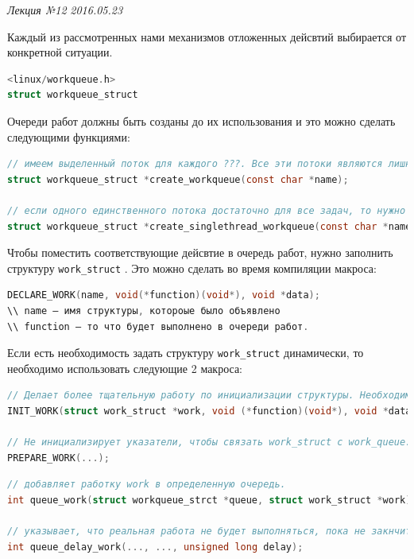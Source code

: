 \clearpage
\begin{flushright}
	\textit{Лекция №12}
	\textit{2016.05.23}
\end{flushright}

Каждый из рассмотренных нами механизмов отложенных дейсвтий выбирается от конкретной ситуации.
 
\begin{lstlisting}[language=c, caption=Очереди работ определяются структурой]
<linux/workqueue.h>
struct workqueue_struct
\end{lstlisting}

Очереди работ должны быть созданы до их использования и это можно сделать следующими функциями:
\begin{lstlisting}[language=c, caption=Создание очереди работ]
// имеем выделенный поток для каждого ???. Все эти потоки являются лишними.
struct workqueue_struct *create_workqueue(const char *name);

// если одного единственного потока достаточно для все задач, то нужно использовать
struct workqueue_struct *create_singlethread_workqueue(const char *name);
\end{lstlisting}

Чтобы поместить соответствующие дейсвтие в очередь работ, нужно заполнить структуру \verb|work_struct| . Это можно сделать во время компиляции макроса:
\begin{lstlisting}[language=c]
DECLARE_WORK(name, void(*function)(void*), void *data);
\\ name – имя структуры, котороые было объявлено
\\ function – то что будет выполнено в очереди работ.
\end{lstlisting}

Если есть необходимость задать структуру \verb|work_struct| динамически, то необходимо использовать следующие 2 макроса:
\begin{lstlisting}[language=c]
// Делает более тщательную работу по инициализации структуры. Необходимо использовать, если делаем первый раз.
INIT_WORK(struct work_struct *work, void (*function)(void*), void *data);

// Не инициализирует указатели, чтобы связать work_struct с work_queue. Если сущетсвует такая возможность, что представленная структура может исзменяться, то надо использовать PREPARE_WORK
PREPARE_WORK(...);
\end{lstlisting}

\begin{lstlisting}[language=c, caption = Функции для отправки работы в очередь работ, label=code_send_work_queue]
// добавляет работку work в определенную очередь.
int queue_work(struct workqueue_strct *queue, struct work_struct *work);

// указывает, что реальная работа не будет выполняться, пока не закнчится установленная задержка.
int queue_delay_work(..., ..., unsigned long delay);
\end{lstlisting}

